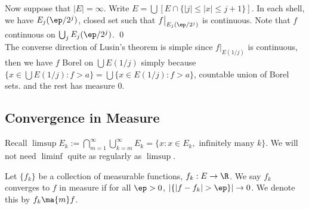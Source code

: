 
Now suppose that $|E|=\infty$. Write $E= \bigcup \left[ E \cap \{ |j| \leq |x| \leq j+1\}\right]$. In each shell, we have $E_j(\ep/2^j)$, closed set such that $f\big|_{E_j(\ep/2^j)}$ is continuous. Note that $f$ continuous on $\bigcup_j E_j(\ep/2^j)$. \qed \\




The converse direction of Lusin's theorem is simple since $f\big|_{E(1/j)}$ is continuous, then we have $f$ Borel on $\bigcup E(1/j)$ simply because $\{x \in \bigcup E(1/j) \colon f>a \}= \bigcup \{x \in E(1/j) \colon f>a\}$, countable union of Borel sets. and the rest has measure 0. 
















\subsection{Convergence in Measure}

Recall $\limsup E_k:= \bigcap_{m=1}^\infty \bigcup_{k=m}^\infty E_k= \{ x \colon x \in E_k, \text{ infinitely many }k\}$. We will not need $\liminf$ quite as regularly as $\limsup$.



\begin{dfn}
Let $\{f_k\}$ be a collection of measurable functions, $f_k: E \to \R$. We say $f_k$ converges to $f$ in measure if for all $\ep>0$, $|\{ |f-f_k|>\ep\}| \to 0$. We denote this by $f_k \ma{m} f$. 
\end{dfn}


